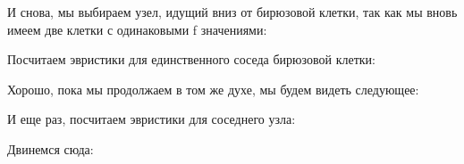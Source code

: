 
И снова, мы выбираем узел, идущий вниз от бирюзовой клетки, так как мы вновь имеем две клетки с одинаковыми f значениями:

\newpage


Посчитаем эвристики для единственного соседа бирюзовой клетки:


Хорошо, пока мы продолжаем в том же духе, мы будем видеть следующее:

\newpage


И еще раз, посчитаем эвристики для соседнего узла:


Двинемся сюда:

\newpage